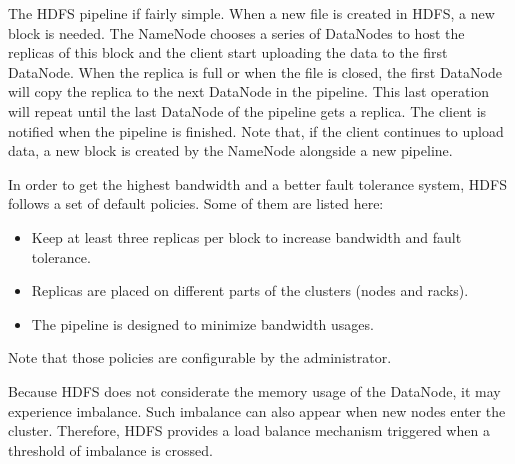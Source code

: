 \documentclass{article}
\begin{document}
The HDFS pipeline if fairly simple.
When a new file is created in HDFS, a new block is needed.
The NameNode chooses a series of DataNodes to host the replicas of this block and the client start uploading the data to the first DataNode.
When the replica is full or when the file is closed, the first DataNode will copy the replica to the next DataNode in the pipeline.
This last operation will repeat until the last DataNode of the pipeline gets a replica.
The client is notified when the pipeline is finished.
Note that, if the client continues to upload data, a new block is created by the NameNode alongside a new pipeline.

In order to get the highest bandwidth and a better fault tolerance system, HDFS follows a set of default policies.
Some of them are listed here:
\begin{itemize}
\item Keep at least three replicas per block to increase bandwidth and fault tolerance.
\item Replicas are placed on different parts of the clusters (nodes and racks).
\item The pipeline is designed to minimize bandwidth usages.
\end{itemize}

Note that those policies are configurable by the administrator.

Because HDFS does not considerate the memory usage of the DataNode, it may experience imbalance.
Such imbalance can also appear when new nodes enter the cluster.
Therefore, HDFS provides a load balance mechanism triggered when a threshold of imbalance is crossed.
\end{document}
